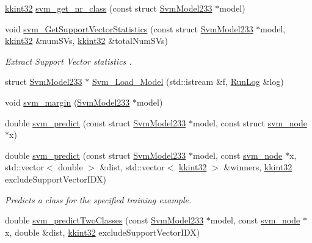\begin{DoxyCompactItemize}
\hyperlink{namespace_k_k_b_a8fa4952cc84fda1de4bec1fbdd8d5b1b}{kkint32} \hyperlink{namespace_s_v_m233_a984b00863783090403acbef40e528504}{svm\+\_\+get\+\_\+nr\+\_\+class} (const struct \hyperlink{struct_s_v_m233_1_1_svm_model233}{Svm\+Model233} $\ast$model)
\item 
void \hyperlink{namespace_s_v_m233_a2aca4dba9ab1088b2bf79c8e079dcb68}{svm\+\_\+\+Get\+Support\+Vector\+Statistics} (const struct \hyperlink{struct_s_v_m233_1_1_svm_model233}{Svm\+Model233} $\ast$model, \hyperlink{namespace_k_k_b_a8fa4952cc84fda1de4bec1fbdd8d5b1b}{kkint32} \&num\+S\+Vs, \hyperlink{namespace_k_k_b_a8fa4952cc84fda1de4bec1fbdd8d5b1b}{kkint32} \&total\+Num\+S\+Vs)
\begin{DoxyCompactList}\small\item\em Extract Support Vector statistics . \end{DoxyCompactList}\item 
struct \hyperlink{struct_s_v_m233_1_1_svm_model233}{Svm\+Model233} $\ast$ \hyperlink{namespace_s_v_m233_abd4b55294fc6a0cfd3da831c6060db3c}{Svm\+\_\+\+Load\+\_\+\+Model} (std\+::istream \&f, \hyperlink{class_k_k_b_1_1_run_log}{Run\+Log} \&log)
\item 
void \hyperlink{namespace_s_v_m233_a10c4a37aa9ee182babbaa44c83742d56}{svm\+\_\+margin} (\hyperlink{struct_s_v_m233_1_1_svm_model233}{Svm\+Model233} $\ast$model)
\item 
double \hyperlink{namespace_s_v_m233_a7f194ec68b77ae5069b5a601d3870371}{svm\+\_\+predict} (const struct \hyperlink{struct_s_v_m233_1_1_svm_model233}{Svm\+Model233} $\ast$model, const struct \hyperlink{struct_s_v_m233_1_1svm__node}{svm\+\_\+node} $\ast$x)
\item 
double \hyperlink{namespace_s_v_m233_ade165985918de891febd8e5a2ae98f93}{svm\+\_\+predict} (const struct \hyperlink{struct_s_v_m233_1_1_svm_model233}{Svm\+Model233} $\ast$model, const \hyperlink{struct_s_v_m233_1_1svm__node}{svm\+\_\+node} $\ast$x, std\+::vector$<$ double $>$ \&dist, std\+::vector$<$ \hyperlink{namespace_k_k_b_a8fa4952cc84fda1de4bec1fbdd8d5b1b}{kkint32} $>$ \&winners, \hyperlink{namespace_k_k_b_a8fa4952cc84fda1de4bec1fbdd8d5b1b}{kkint32} exclude\+Support\+Vector\+I\+DX)
\begin{DoxyCompactList}\small\item\em Predicts a class for the specified training example. \end{DoxyCompactList}\item 
double \hyperlink{namespace_s_v_m233_a558a3dbd2873b3211831500197cc7a59}{svm\+\_\+predict\+Two\+Classes} (const \hyperlink{struct_s_v_m233_1_1_svm_model233}{Svm\+Model233} $\ast$model, const \hyperlink{struct_s_v_m233_1_1svm__node}{svm\+\_\+node} $\ast$x, double \&dist, \hyperlink{namespace_k_k_b_a8fa4952cc84fda1de4bec1fbdd8d5b1b}{kkint32} exclude\+Support\+Vector\+I\+DX)

\end{DoxyCompactItemize}
